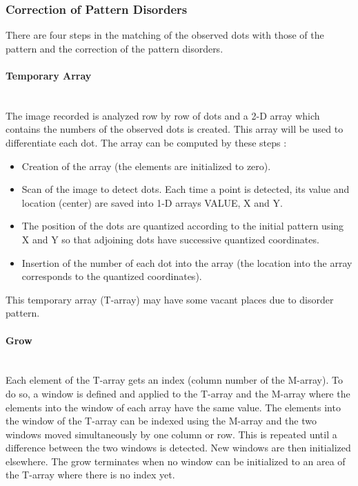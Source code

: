 \subsubsection{Correction of Pattern Disorders}
There are four steps in the matching of the observed dots with those of the pattern and the correction of the pattern disorders.





\paragraph*{Temporary Array}
~~\\
The image recorded is analyzed row by row of dots and a 2-D array which contains the numbers of the observed dots is created. This array will be used to differentiate each dot. The array can be computed by these steps :
\begin{itemize}
\item Creation of the array (the elements are initialized to zero).
\item Scan of the image to detect dots. Each time a point is detected, its value and location (center) are saved into 1-D arrays VALUE, X and Y.
\item The position of the dots are quantized according to the initial pattern using X and Y so that adjoining dots have successive quantized coordinates.
\item Insertion of the number of each dot into the array (the location into the array corresponds to the quantized coordinates).
\end{itemize}

This temporary array (T-array) may have some vacant places due to disorder pattern.

\paragraph*{Grow}
~~\\
Each element of the T-array gets an index (column number of the M-array). To do so, a window is defined and applied to the T-array and the M-array where the elements into the window of each array have the same value. The elements into the window of the T-array can be indexed using the M-array and the two windows moved simultaneously by one column or row. This is repeated until a difference between the two windows is detected. New windows are then initialized elsewhere. The grow terminates when no window can be initialized to an area of the T-array where there is no index yet.


